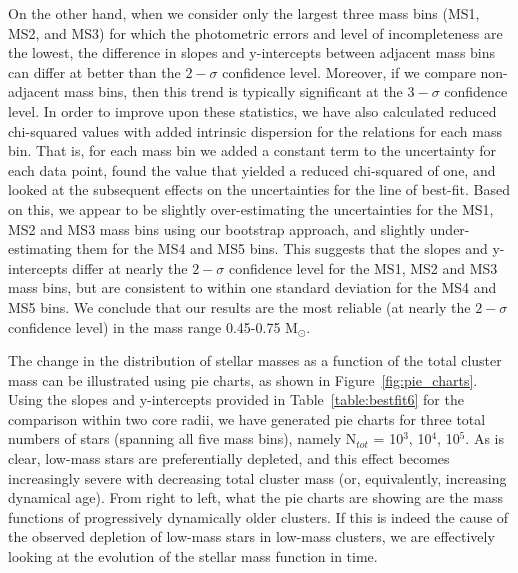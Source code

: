 On the other hand, when we consider only the largest three mass bins
(MS1, MS2, and MS3) for which 
the photometric errors and level of incompleteness are the lowest, the
difference in slopes and y-intercepts between adjacent mass bins can
differ at better than the $2-\sigma$ confidence level.  Moreover, if we
compare non-adjacent mass bins, then this trend is typically
significant at the $3-\sigma$ confidence level.  In order to improve
upon these statistics, we have also calculated reduced chi-squared
values with added intrinsic dispersion for the relations for each mass
bin.  That is, for each mass bin we added a constant term to the uncertainty for each
data point, found the value that yielded a reduced chi-squared of one,
and looked at the subsequent effects on the uncertainties for the
line of best-fit.  Based on this, we appear to be slightly over-estimating the
uncertainties for the MS1, MS2 and MS3 mass bins using our bootstrap
approach, and slightly under-estimating them for the MS4 and MS5
bins.  This suggests that the slopes and y-intercepts differ at nearly
the $2-\sigma$ confidence level for the MS1, MS2 and MS3 mass bins,
but are consistent to within one standard deviation for the MS4 and
MS5 bins.  We conclude that our results are the most reliable (at nearly the
$2-\sigma$ confidence level) in the mass range 0.45-0.75 M$_{\odot}$. 

The change in the distribution of stellar masses as a function of the
total cluster mass can be illustrated using pie charts, as shown in
Figure~\ref{fig:pie_charts}.  Using the slopes and y-intercepts
provided in Table~\ref{table:bestfit6} for the comparison within two core
radii, we have generated pie charts for three total numbers of stars
(spanning all five mass bins), namely N$_{tot}$ = 10$^3$, 10$^4$,
10$^5$.  As is clear, low-mass stars are preferentially depleted, and
this effect becomes increasingly severe with decreasing total cluster
mass (or, equivalently, increasing dynamical age).  From right to
left, what the pie charts are showing are the mass
functions of progressively dynamically older clusters.  %
If this is indeed the cause of the observed depletion of low-mass
stars in low-mass clusters, we are effectively looking at the
evolution of the stellar mass function in time.   

